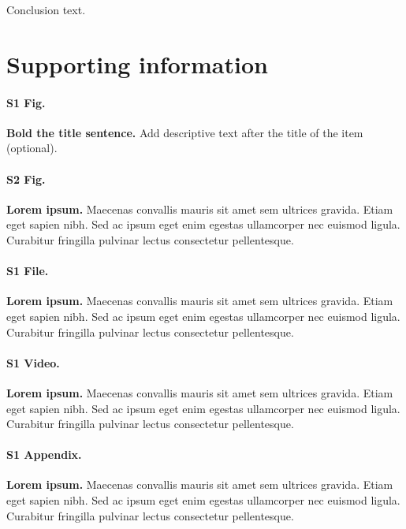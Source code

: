 \documentclass[10pt,letterpaper]{article}
\begin{document}
Conclusion text. 

\section*{Supporting information}

\paragraph*{S1 Fig.}
\label{S1_Fig}
{\bf Bold the title sentence.} Add descriptive text after the title of the item (optional).

\paragraph*{S2 Fig.}
\label{S2_Fig}
{\bf Lorem ipsum.} Maecenas convallis mauris sit amet sem ultrices gravida. Etiam eget sapien nibh. Sed ac ipsum eget enim egestas ullamcorper nec euismod ligula. Curabitur fringilla pulvinar lectus consectetur pellentesque.

\paragraph*{S1 File.}
\label{S1_File}
{\bf Lorem ipsum.}  Maecenas convallis mauris sit amet sem ultrices gravida. Etiam eget sapien nibh. Sed ac ipsum eget enim egestas ullamcorper nec euismod ligula. Curabitur fringilla pulvinar lectus consectetur pellentesque.

\paragraph*{S1 Video.}
\label{S1_Video}
{\bf Lorem ipsum.}  Maecenas convallis mauris sit amet sem ultrices gravida. Etiam eget sapien nibh. Sed ac ipsum eget enim egestas ullamcorper nec euismod ligula. Curabitur fringilla pulvinar lectus consectetur pellentesque.

\paragraph*{S1 Appendix.}
\label{S1_Appendix}
{\bf Lorem ipsum.} Maecenas convallis mauris sit amet sem ultrices gravida. Etiam eget sapien nibh. Sed ac ipsum eget enim egestas ullamcorper nec euismod ligula. Curabitur fringilla pulvinar lectus consectetur pellentesque.
\end{document}

